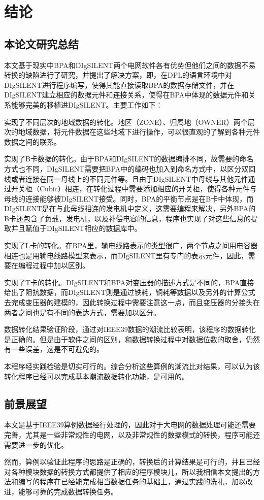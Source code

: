 \chapter{结论}

\section{本论文研究总结}

本文基于现实中BPA和DIgSILENT两个电网软件各有优势但他们之间的数据不易转换的缺陷进行了研究，并提出了解决方案，即，在DPL的语言环境中对DIgSILENT进行程序编写，使得其能直接读取BPA的数据存储文件，并在DIgSILENT建立相应的数据元件和连接关系，使得在BPA中体现的数据元件和关系能够完美的移植进DIgSILENT。主要工作如下：

\begin{description}[1cm]
\item[-] 实现了不同层次的地域数据的转化。地区（ZONE）、归属地（OWNER）两个层次的地域数据，将元件数据在这些地域下进行操作，可以很直观的了解到各种元件数据之间的联系。
\item[-] 实现了B卡数据的转化。由于BPA和DIgSILENT的数据编排不同，故需要的命名方式也不同，DIgSILENT需要把BPA中的编码也加入到命名方式中，以区分双回线或者连接在同一母线上的不同元件等。且由于DIgSILENT中母线与其他元件通过开关柜（Cubic）相连，在转化过程中需要添加相应的开关柜，使得各种元件与母线的连接能够被DIgSILENT接受。同时，BPA的平衡节点是在B卡中体现，而DIgSILENT是在与此母线相连的发电机中定义，这需要编程来解决，另外BPA的B卡还包含了负载，发电机，以及补偿电容的信息，程序也实现了对这些信息的提取并且赋值于DIgSILENT相应的数据库中。
\item[-] 实现了L卡的转化。在BPA里，输电线路表示的类型很广，两个节点之间用电容器相连也是用输电线路模型来表示，而DIgSILENT里有专门的表示元件，因此，需要在编程过程中加以区别。
\item[-] 实现了T卡的转化。DIgSILENT和BPA对变压器的描述方式是不同的，BPA直接给出了阻抗数据，而DIgSILENT则是通过铁耗，铜耗等数据以及另外的计算公式去完成变压器的建模的，因此转换过程中需要注意这一点，而且变压器的分接头在两者之间也是有不同的表达方式，需要加以区分。
\end{description}

数据转化结果验证阶段，通过对IEEE39数据的潮流比较表明，该程序的数据转化是正确的。但是由于软件之间的区别，和数据转换过程中对数据位数的取舍，仍然有一些误差，这是不可避免的。

本程序经实践检验是切实可行的。综合分析这些算例的潮流比对结果，可以认为该转化程序已经可以完成基本潮流数据转化功能，是可用的。

\section{前景展望}

本文是基于IEEE39算例数据经行处理的，因此对于大电网的数据处理可能还需要完善，尤其是一些非常规性的电网，以及非常规性的数据模式的转换，程序可能还需要进一步的优化。

然而，算例以验证此程序的思路是正确的，转换后的计算结果是可行的，并且已经对各种模块数据的转换方式都提供了相应的程序模块儿，所以我相信本文提出的方法和编写的程序在已经能完成相当数据任务的基础上，通过实践的洗礼，加以改进，能够可靠的完成数据转换任务。
